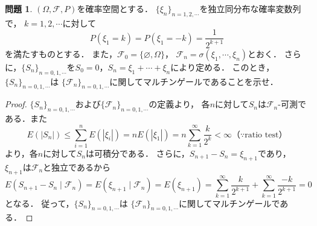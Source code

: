 \documentclass{jsarticle}
\theoremstyle{definition}
\newtheorem{qst}{問題}
\begin{document}
\begin{qst}
$(\Omega,\mathcal{F},P)$を確率空間とする．
$\{\xi_n\}_{n=1,2,\cdots}$を独立同分布な確率変数列で，
$k=1,2,\cdots$に対して
\[ P(\xi_1=k)=P(\xi_1=-k)=\frac{1}{2^{k+1}} \]
を満たすものとする．
また，$\mathcal{F}_0=\{\varnothing,\Omega\}$，
$\mathcal{F}_n=\sigma(\xi_1,\cdots,\xi_n)$とおく．
さらに，$\{S_n\}_{n=0,1,\cdots}$を$S_0=0$，$S_n=\xi_1+\cdots+\xi_n$により定める．
このとき，$\{S_n\}_{n=0,1,\cdots}$は
$\{\mathcal{F}_n\}_{n=0,1,\cdots}$に関してマルチンゲールであることを示せ．
\end{qst}
\begin{proof}
$\{S_n\}_{n=0,1,\cdots}$および$\{\mathcal{F}_n\}_{n=0,1,\cdots}$の定義より，
各$n$に対して$S_n$は$\mathcal{F}_n$-可測である．また
\[ E(|S_n|)\leq\sum_{i=1}^nE(|\xi_i|)
=nE(|\xi_1|)=n\sum_{k=1}^\infty\frac{k}{2^k}<\infty
（\because\text{ratio test}） \]
より，各$n$に対して$S_n$は可積分である．
さらに，$S_{n+1}-S_n=\xi_{n+1}$であり，
$\xi_{n+1}$は$\mathcal{F}_n$と独立であるから
\[ E(S_{n+1}-S_n\mid\mathcal{F}_n)=
E(\xi_{n+1}\mid\mathcal{F}_n)=E(\xi_{n+1})
=\sum_{k=1}^\infty\frac{k}{2^{k+1}}+\sum_{k=1}^\infty\frac{-k}{2^{k+1}}
=0 \]
となる．
従って，$\{S_n\}_{n=0,1,\cdots}$は
$\{\mathcal{F}_n\}_{n=0,1,\cdots}$に関してマルチンゲールである．
\end{proof}
\end{document}
